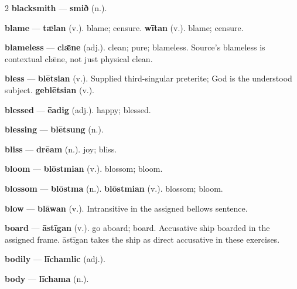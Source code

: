 \begin{multicols}{2}
\textbf{blacksmith} — \textbf{smið} (n.).\par
\textbf{blame} — \textbf{tǣlan} (v.). blame; censure. \textbf{wītan} (v.). blame; censure.\par
\textbf{blameless} — \textbf{clǣne} (adj.). clean; pure; blameless. Source's blameless is contextual clǣne, not just physical clean.\par
\textbf{bless} — \textbf{blētsian} (v.). Supplied third-singular preterite; God is the understood subject. \textbf{geblētsian} (v.).\par
\textbf{blessed} — \textbf{ēadig} (adj.). happy; blessed.\par
\textbf{blessing} — \textbf{blētsung} (n.).\par
\textbf{bliss} — \textbf{drēam} (n.). joy; bliss.\par
\textbf{bloom} — \textbf{blōstmian} (v.). blossom; bloom.\par
\textbf{blossom} — \textbf{blōstma} (n.).  \textbf{blōstmian} (v.). blossom; bloom.\par
\textbf{blow} — \textbf{blāwan} (v.). Intransitive in the assigned bellows sentence.\par
\textbf{board} — \textbf{āstīgan} (v.). go aboard; board. Accusative ship boarded in the assigned frame. āstīgan takes the ship as direct accusative in these exercises.\par
\textbf{bodily} — \textbf{līchamlic} (adj.).\par
\textbf{body} — \textbf{līchama} (n.).\par

\end{multicols}
